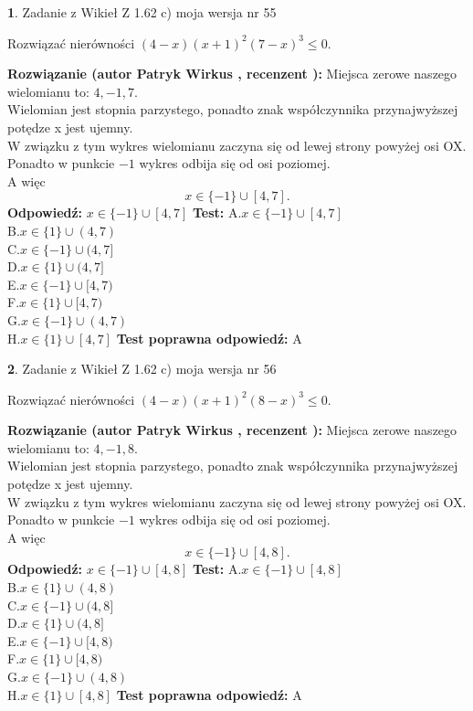 \documentclass[12pt, a4paper]{article}
\theoremstyle{definition} %
\newtheorem{zad}{}
\newcommand{\zadStart}[1]{\begin{zad}#1\newline}
\newcommand{\zadStop}{\end{zad}}
\newcommand{\rozwStart}[2]{\noindent \textbf{Rozwiązanie (autor #1 , recenzent #2): }\newline}
\newcommand{\rozwStop}{\newline}
\newcommand{\odpStart}{\noindent \textbf{Odpowiedź:}\newline}
\newcommand{\odpStop}{\newline}
\newcommand{\testStart}{\noindent \textbf{Test:}\newline}
\newcommand{\testStop}{\newline}
\newcommand{\kluczStart}{\noindent \textbf{Test poprawna odpowiedź:}\newline}
\newcommand{\kluczStop}{\newline}
\begin{document}
\zadStart{Zadanie z Wikieł Z 1.62 c) moja wersja nr 55}

Rozwiązać nierówności $(4-x)(x+1)^{2}(7-x)^{3}\le0$.
\zadStop
\rozwStart{Patryk Wirkus}{}
Miejsca zerowe naszego wielomianu to: $4, -1, 7$.\\
Wielomian jest stopnia parzystego, ponadto znak współczynnika przy\linebreak najwyższej potędze x jest ujemny.\\ W związku z tym wykres wielomianu zaczyna się od lewej strony powyżej osi OX.\\
Ponadto w punkcie $-1$ wykres odbija się od osi poziomej.\\
A więc $$x \in \{-1\} \cup [4,7].$$
\rozwStop
\odpStart
$x \in \{-1\} \cup [4,7]$
\odpStop
\testStart
A.$x \in \{-1\} \cup [4,7]$\\
B.$x \in \{1\} \cup (4,7)$\\
C.$x \in \{-1\} \cup (4,7]$\\
D.$x \in \{1\} \cup (4,7]$\\
E.$x \in \{-1\} \cup [4,7)$\\
F.$x \in \{1\} \cup [4,7)$\\
G.$x \in \{-1\} \cup (4,7)$\\
H.$x \in \{1\} \cup [4,7]$
\testStop
\kluczStart
A
\kluczStop



\zadStart{Zadanie z Wikieł Z 1.62 c) moja wersja nr 56}

Rozwiązać nierówności $(4-x)(x+1)^{2}(8-x)^{3}\le0$.
\zadStop
\rozwStart{Patryk Wirkus}{}
Miejsca zerowe naszego wielomianu to: $4, -1, 8$.\\
Wielomian jest stopnia parzystego, ponadto znak współczynnika przy\linebreak najwyższej potędze x jest ujemny.\\ W związku z tym wykres wielomianu zaczyna się od lewej strony powyżej osi OX.\\
Ponadto w punkcie $-1$ wykres odbija się od osi poziomej.\\
A więc $$x \in \{-1\} \cup [4,8].$$
\rozwStop
\odpStart
$x \in \{-1\} \cup [4,8]$
\odpStop
\testStart
A.$x \in \{-1\} \cup [4,8]$\\
B.$x \in \{1\} \cup (4,8)$\\
C.$x \in \{-1\} \cup (4,8]$\\
D.$x \in \{1\} \cup (4,8]$\\
E.$x \in \{-1\} \cup [4,8)$\\
F.$x \in \{1\} \cup [4,8)$\\
G.$x \in \{-1\} \cup (4,8)$\\
H.$x \in \{1\} \cup [4,8]$
\testStop
\kluczStart
A
\kluczStop
\end{document}
